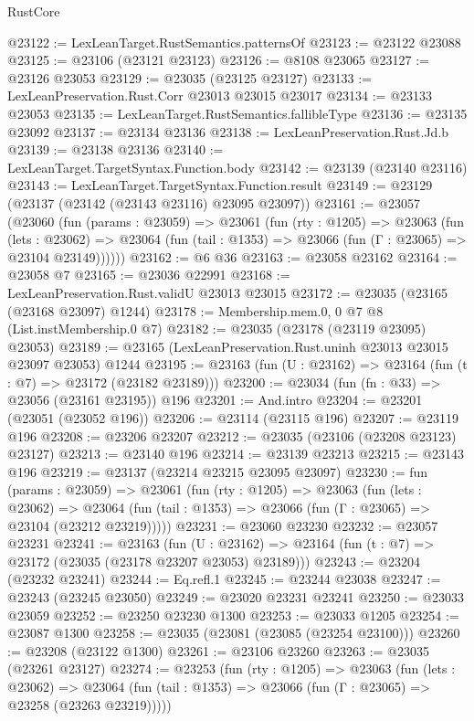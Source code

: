 \begin{lexlean}{RustCore}
\begin{coremodule}
@23122 := LexLeanTarget.RustSemantics.patternsOf
@23123 := @23122 @23088
@23125 := @23106 (@23121 @23123)
@23126 := @8108 @23065
@23127 := @23126 @23053
@23129 := @23035 (@23125 @23127)
@23133 := LexLeanPreservation.Rust.Corr @23013 @23015 @23017
@23134 := @23133 @23053
@23135 := LexLeanTarget.RustSemantics.fallibleType
@23136 := @23135 @23092
@23137 := @23134 @23136
@23138 := LexLeanPreservation.Rust.Jd.b
@23139 := @23138 @23136
@23140 := LexLeanTarget.TargetSyntax.Function.body
@23142 := @23139 (@23140 @23116)
@23143 := LexLeanTarget.TargetSyntax.Function.result
@23149 := @23129 (@23137 (@23142 (@23143 @23116) @23095 @23097))
@23161 := @23057
    (@23060
      (fun (params : @23059) =>
      @23061
        (fun (rty : @1205) =>
        @23063
          (fun (lets : @23062) =>
          @23064 (fun (tail : @1353) => @23066 (fun (Γ : @23065) => @23104 @23149))))))
@23162 := @6 @36
@23163 := @23058 @23162
@23164 := @23058 @7
@23165 := @23036 @22991
@23168 := LexLeanPreservation.Rust.validU @23013 @23015
@23172 := @23035 (@23165 (@23168 @23097) @1244)
@23178 := Membership.mem.{0, 0} @7 @8 (List.instMembership.{0} @7)
@23182 := @23035 (@23178 (@23119 @23095) @23053)
@23189 := @23165 (LexLeanPreservation.Rust.uninh @23013 @23015 @23097 @23053) @1244
@23195 := @23163 (fun (U : @23162) => @23164 (fun (t : @7) => @23172 (@23182 @23189)))
@23200 := @23034 (fun (fn : @33) => @23056 (@23161 @23195)) @196
@23201 := And.intro
@23204 := @23201 (@23051 (@23052 @196))
@23206 := @23114 (@23115 @196)
@23207 := @23119 @196
@23208 := @23206 @23207
@23212 := @23035 (@23106 (@23208 @23123) @23127)
@23213 := @23140 @196
@23214 := @23139 @23213
@23215 := @23143 @196
@23219 := @23137 (@23214 @23215 @23095 @23097)
@23230 := fun (params : @23059) =>
  @23061
    (fun (rty : @1205) =>
    @23063
      (fun (lets : @23062) =>
      @23064 (fun (tail : @1353) => @23066 (fun (Γ : @23065) => @23104 (@23212 @23219)))))
@23231 := @23060 @23230
@23232 := @23057 @23231
@23241 := @23163
    (fun (U : @23162) => @23164 (fun (t : @7) => @23172 (@23035 (@23178 @23207 @23053) @23189)))
@23243 := @23204 (@23232 @23241)
@23244 := Eq.refl.{1}
@23245 := @23244 @23038
@23247 := @23243 (@23245 @23050)
@23249 := @23020 @23231 @23241
@23250 := @23033 @23059
@23252 := @23250 @23230 @1300
@23253 := @23033 @1205
@23254 := @23087 @1300
@23258 := @23035 (@23081 (@23085 (@23254 @23100)))
@23260 := @23208 (@23122 @1300)
@23261 := @23106 @23260
@23263 := @23035 (@23261 @23127)
@23274 := @23253
    (fun (rty : @1205) =>
    @23063
      (fun (lets : @23062) =>
      @23064 (fun (tail : @1353) => @23066 (fun (Γ : @23065) => @23258 (@23263 @23219)))))

\end{coremodule}
\end{lexlean}
